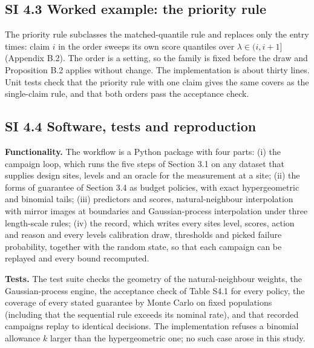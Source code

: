 \documentclass{iopjournal}
\begin{document}
\hypertarget{si-4.3-worked-example-the-priority-rule}{%
\subsection*{SI 4.3 Worked example: the priority rule}\label{si-4.3-worked-example-the-priority-rule}}

The priority rule subclasses the matched-quantile rule and replaces only the entry times: claim \(i\) in the order sweeps its own score quantiles over \(\lambda \in (i, i + 1]\) (Appendix B.2). The order is a setting, so the family is fixed before the draw and Proposition B.2 applies without change. The implementation is about thirty lines. Unit tests check that the priority rule with one claim gives the same covers as the single-claim rule, and that both orders pass the acceptance check.

\hypertarget{si-4.4-software-tests-and-reproduction}{%
\subsection*{SI 4.4 Software, tests and reproduction}\label{si-4.4-software-tests-and-reproduction}}

\textbf{Functionality.} The workflow is a Python package with four parts: (i) the campaign loop, which runs the five steps of Section 3.1 on any dataset that supplies design sites, levels and an oracle for the measurement at a site; (ii) the forms of guarantee of Section 3.4 as budget policies, with exact hypergeometric and binomial tails; (iii) predictors and scores, natural-neighbour interpolation with mirror images at boundaries and Gaussian-process interpolation under three length-scale rules; (iv) the record, which writes every site\textquotesingle s level, scores, action and reason and every level\textquotesingle s calibration draw, thresholds and picked failure probability, together with the random state, so that each campaign can be replayed and every bound recomputed.

\textbf{Tests.} The test suite checks the geometry of the natural-neighbour weights, the Gaussian-process engine, the acceptance check of Table S4.1 for every policy, the coverage of every stated guarantee by Monte Carlo on fixed populations (including that the sequential rule exceeds its nominal rate), and that recorded campaigns replay to identical decisions. The implementation refuses a binomial allowance \(k\) larger than the hypergeometric one; no such case arose in this study.
\end{document}
